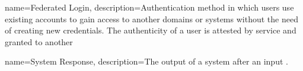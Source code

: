  {
    name={Federated Login},
    description={Authentication method in which users use existing accounts to gain access to another domains or systems
    without the need of creating new credentials. The authenticity of a user is attested by service and granted to another 
    \cite{refonline:MRFL}}
}

 {
    name={System Response},
    description={The output of a system after an input \cite{refonline:HWHE}.
    \cite{refonline:MRFL}}
}











    
    \tableofcontents
    \newpage
    \clearpage
    \printglossary[type=acronym,title=Abbreviations,toctitle=Abbreviations]
    \clearpage
    \newpage
    \clearpage
    \printglossary[title=Glossary,toctitle=Glossary]
    \clearpage
    
    
    
    
    \nocite{*}
    
    
        
